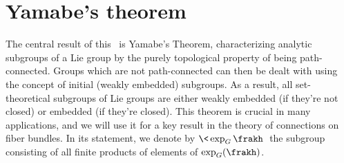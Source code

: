 




\section{Yamabe's theorem}\label{sec: Yamabe's theorem}

The central result of this \sect\ is Yamabe's Theorem, characterizing analytic subgroups of a Lie group by the purely topological property of being path-connected. Groups which are not path-connected can then be dealt with using the concept of initial (weakly embedded) subgroups. As a result, all set-theoretical subgroups of Lie groups are either weakly embedded (if they're not closed) or embedded (if they're closed). This theorem is crucial in many applications, and we will use it for a key result in the theory of connections on fiber bundles. In its statement, we denote by $\<\exp_G \frakh\>$ the subgroup consisting of all finite products of elements of $\exp_G(\frakh)$.


